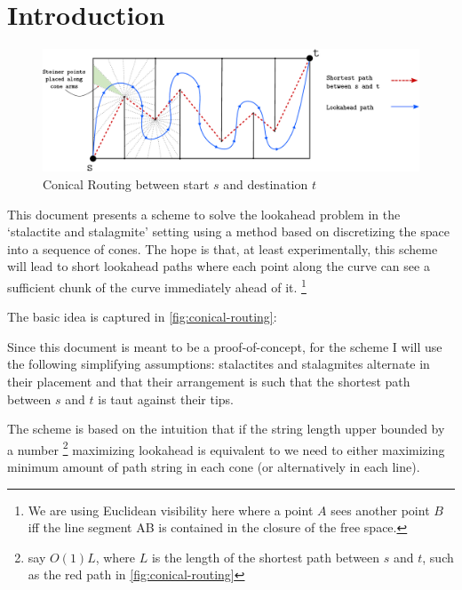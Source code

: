 \section{Introduction}%




\begin{figure}[H]
\centering
\includegraphics[width=16cm]{miscimages/stalactites-stalagmites.pdf}
\caption{Conical Routing between start $s$ and destination $t$}
\label{fig:conical-routing}
\end{figure}



This document presents a scheme  to solve the lookahead problem 
in the `stalactite and stalagmite' setting using a method based on discretizing the space into a sequence of cones. 
The hope is that, at least experimentally, this scheme will lead to short lookahead paths where each point along the 
curve can see a sufficient chunk of the curve immediately ahead of it. \footnote{We are using Euclidean visibility here
where a point $A$ sees another point $B$ iff the line segment AB is contained in the closure of the free space. }


The basic idea is captured in \autoref{fig:conical-routing}:

Since this document is meant to be a proof-of-concept, for the scheme I will 
use the following simplifying assumptions: stalactites and stalagmites 
alternate in their placement and that their arrangement is such that the shortest path between 
$s$ and $t$ is taut against their tips. 



The scheme is based on the intuition that if the string length upper bounded by a number 
\footnote{say $O(1)L$, where $L$ is the length of the shortest path between $s$ and $t$, 
          such as the red path in \autoref{fig:conical-routing}}
maximizing lookahead is equivalent to  we need to either maximizing minimum 
amount of path string in each cone (or alternatively in each line). 

